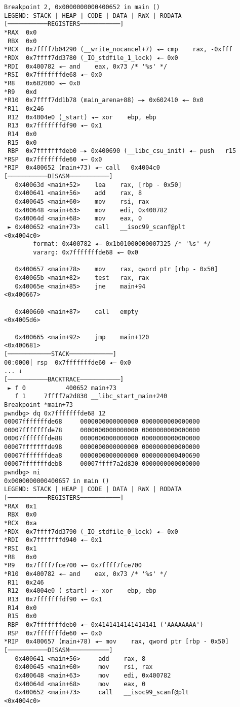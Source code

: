 \documentclass{article}
\begin{document}
\begin{lstlisting}
Breakpoint 2, 0x0000000000400652 in main ()
LEGEND: STACK | HEAP | CODE | DATA | RWX | RODATA
[───────────REGISTERS───────────]
*RAX  0x0
 RBX  0x0
*RCX  0x7ffff7b04290 (__write_nocancel+7) ◂— cmp    rax, -0xfff
*RDX  0x7ffff7dd3780 (_IO_stdfile_1_lock) ◂— 0x0
*RDI  0x400782 ◂— and    eax, 0x73 /* '%s' */
*RSI  0x7fffffffde68 ◂— 0x0
*R8   0x602000 ◂— 0x0
*R9   0xd
*R10  0x7ffff7dd1b78 (main_arena+88) —▸ 0x602410 ◂— 0x0
*R11  0x246
 R12  0x4004e0 (_start) ◂— xor    ebp, ebp
 R13  0x7fffffffdf90 ◂— 0x1
 R14  0x0
 R15  0x0
 RBP  0x7fffffffdeb0 —▸ 0x400690 (__libc_csu_init) ◂— push   r15
*RSP  0x7fffffffde60 ◂— 0x0
*RIP  0x400652 (main+73) ◂— call   0x4004c0
[───────────DISASM───────────]
   0x40063d <main+52>    lea    rax, [rbp - 0x50]
   0x400641 <main+56>    add    rax, 8
   0x400645 <main+60>    mov    rsi, rax
   0x400648 <main+63>    mov    edi, 0x400782
   0x40064d <main+68>    mov    eax, 0
 ► 0x400652 <main+73>    call   __isoc99_scanf@plt            <0x4004c0>
        format: 0x400782 ◂— 0x1b01000000007325 /* '%s' */
        vararg: 0x7fffffffde68 ◂— 0x0
 
   0x400657 <main+78>    mov    rax, qword ptr [rbp - 0x50]
   0x40065b <main+82>    test   rax, rax
   0x40065e <main+85>    jne    main+94                       <0x400667>
 
   0x400660 <main+87>    call   empty                         <0x4005d6>
 
   0x400665 <main+92>    jmp    main+120                      <0x400681>
[────────────STACK────────────]
00:0000│ rsp  0x7fffffffde60 ◂— 0x0
... ↓
[───────────BACKTRACE───────────]
 ► f 0           400652 main+73
   f 1     7ffff7a2d830 __libc_start_main+240
Breakpoint *main+73
pwndbg> dq 0x7fffffffde68 12
00007fffffffde68     0000000000000000 0000000000000000
00007fffffffde78     0000000000000000 0000000000000000
00007fffffffde88     0000000000000000 0000000000000000
00007fffffffde98     0000000000000000 0000000000000000
00007fffffffdea8     0000000000000000 0000000000400690
00007fffffffdeb8     00007ffff7a2d830 0000000000000000
pwndbg> ni
0x0000000000400657 in main ()
LEGEND: STACK | HEAP | CODE | DATA | RWX | RODATA
[───────────REGISTERS───────────]
*RAX  0x1
 RBX  0x0
*RCX  0xa
*RDX  0x7ffff7dd3790 (_IO_stdfile_0_lock) ◂— 0x0
*RDI  0x7fffffffd940 ◂— 0x1
*RSI  0x1
*R8   0x0
*R9   0x7ffff7fce700 ◂— 0x7ffff7fce700
*R10  0x400782 ◂— and    eax, 0x73 /* '%s' */
 R11  0x246
 R12  0x4004e0 (_start) ◂— xor    ebp, ebp
 R13  0x7fffffffdf90 ◂— 0x1
 R14  0x0
 R15  0x0
 RBP  0x7fffffffdeb0 ◂— 0x4141414141414141 ('AAAAAAAA')
 RSP  0x7fffffffde60 ◂— 0x0
*RIP  0x400657 (main+78) ◂— mov    rax, qword ptr [rbp - 0x50]
[───────────DISASM───────────]
   0x400641 <main+56>     add    rax, 8
   0x400645 <main+60>     mov    rsi, rax
   0x400648 <main+63>     mov    edi, 0x400782
   0x40064d <main+68>     mov    eax, 0
   0x400652 <main+73>     call   __isoc99_scanf@plt            <0x4004c0>
 

\end{lstlisting}
\end{document}
